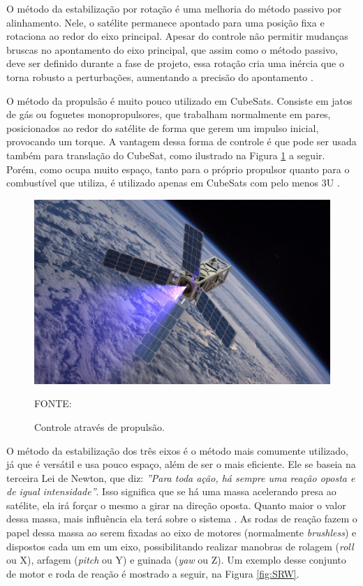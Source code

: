\documentclass[
	12pt,				%
	openany,			%
	twoside,			%
	a4paper,			%
	english,			%
	french,				%
	spanish,			%
	brazil,				%
	oldfontcommands
	]{abntex2}
\begin{document}
\newpage

O método da estabilização por rotação é uma melhoria do método passivo por alinhamento. Nele, o satélite permanece apontado para uma posição fixa e rotaciona ao redor do eixo principal. Apesar do controle não permitir mudanças bruscas no apontamento do eixo principal, que assim como o método passivo, deve ser definido durante a fase de projeto, essa rotação cria uma inércia que o torna robusto a perturbações, aumentando a precisão do apontamento \cite{FrancLav}.

O método da propulsão é muito pouco utilizado em CubeSats. Consiste em jatos de gás ou foguetes monopropulsores, que trabalham normalmente em pares, posicionados ao redor do satélite de forma que gerem um impulso inicial, provocando um torque. A vantagem dessa forma de controle é que pode ser usada também para translação do CubeSat, como ilustrado na Figura \ref{fig:Propulsion} a seguir. Porém, como ocupa muito espaço, tanto para o próprio propulsor quanto para o combustível que utiliza, é utilizado apenas em CubeSats com pelo menos 3U \cite{Luka}.

\begin{figure}[th]
	\caption{Controle através de propulsão.}
	\centering
	\includegraphics[width=0.6\linewidth]{./figs/Propulsion}
	
	\begin{small}
		FONTE: \cite{Prop}
	\end{small}
	\label{fig:Propulsion}
\end{figure}


O método da estabilização dos três eixos é o método mais comumente utilizado, já que é versátil e usa pouco espaço, além de ser o mais eficiente. Ele se baseia na terceira Lei de Newton, que diz: \textit{''Para toda ação, há sempre uma reação oposta e de igual intensidade''}. Isso significa que se há uma massa acelerando presa ao satélite, ela irá forçar o mesmo a girar na direção oposta. Quanto maior o valor dessa massa, mais influência ela terá sobre o sistema \cite{Ericksson}. As rodas de reação fazem o papel dessa massa ao serem fixadas ao eixo de motores (normalmente \textit{brushless}) e dispostos cada um em um eixo, possibilitando realizar manobras de rolagem (\textit{roll} ou X), arfagem (\textit{pitch} ou Y) e guinada (\textit{yaw} ou Z). Um exemplo desse conjunto de motor e roda de reação é mostrado a seguir, na Figura \ref{fig:SRW}.
\end{document}
